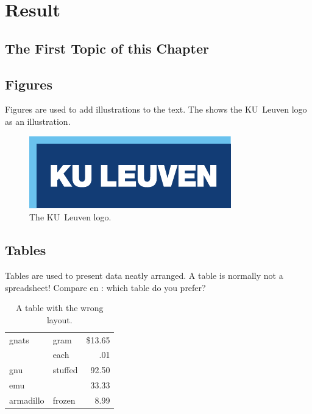 \chapter{Result}
\label{cha:5}


\section{The First Topic of this Chapter}


\section{Figures}
Figures are used to add illustrations to the text. The  shows
the KU~Leuven logo as an illustration.
\begin{figure}
	\centering
	\includegraphics{logokul}
	\caption{The KU~Leuven logo.}
	\label{fig:logo}
\end{figure}

\section{Tables}
Tables are used to present data neatly arranged. A table is normally
not a spreadsheet! Compare  en : which table do
you prefer?

\begin{table}
	\centering
	\begin{tabular}{||l|lr||} \hline
		gnats     & gram      & \$13.65 \\ \cline{2-3}
		& each      & .01 \\ \hline
		gnu       & stuffed   & 92.50 \\ \cline{1-1} \cline{3-3}
		emu       &           & 33.33 \\ \hline
		armadillo & frozen    & 8.99 \\ \hline
	\end{tabular}
	\caption{A table with the wrong layout.}
	\label{tab:wrong}
\end{table}

